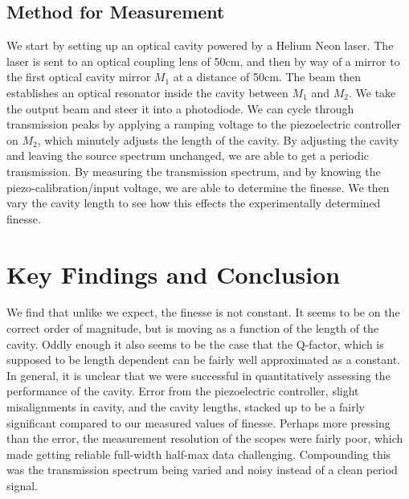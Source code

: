 \documentclass[11pt]{article}
\begin{document}
\subsection{Method for Measurement}
We start by setting up an optical cavity powered by a Helium Neon laser. The laser is sent to an optical coupling lens of 50cm, and then by way of a mirror to the first optical cavity mirror $M_1$ at a distance of 50cm. The beam then establishes an optical resonator inside the cavity between $M_1$ and $M_2$. We take the output beam and steer it into a photodiode. We can cycle through transmission peaks by applying a ramping voltage to the piezoelectric controller on $M_2$, which minutely adjusts the length of the cavity. By adjusting the cavity and leaving the source spectrum unchanged, we are able to get a periodic transmission. By measuring the transmission spectrum, and by knowing the piezo-calibration/input voltage, we are able to determine the finesse. We then vary the cavity length to see how this effects the experimentally determined finesse. 

\section{Key Findings and Conclusion}
We find that unlike we expect, the finesse is not constant. It seems to be on the correct order of magnitude, but is moving as a function of the length of the cavity. Oddly enough it also seems to be the case that the Q-factor, which is supposed to be length dependent can be fairly well approximated as a constant. In general, it is unclear that we were successful in quantitatively assessing the performance of the cavity. Error from the piezoelectric controller, slight misalignments in cavity, and the cavity lengths, stacked up to be a fairly significant compared to our measured values of finesse. Perhaps more pressing than the error, the measurement resolution of the scopes were fairly poor, which made getting reliable full-width half-max data challenging. Compounding this was the  transmission spectrum being varied and noisy instead of a clean period signal. 
\end{document}
